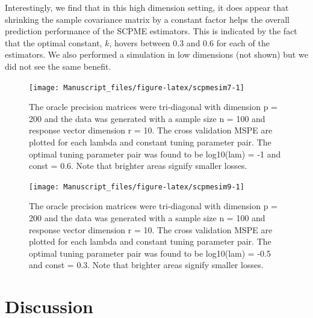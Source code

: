 \documentclass[11pt,]{report}
\theoremstyle{definition}
\theoremstyle{definition}
\theoremstyle{definition}
\theoremstyle{remark}
\begin{document}
Interestingly, we find that in this high dimension setting, it does appear that shrinking the sample covariance matrix by a constant factor helps the overall prediction performance of the SCPME estimators. This is indicated by the fact that the optimal constant, \(k\), hovers between 0.3 and 0.6 for each of the estimators. We also performed a simulation in low dimensions (not shown) but we did not see the same benefit.

\vspace{0.5cm}

\vspace{0.5cm}
\begin{figure}

{\centering \texttt{[image: Manuscript\_files/figure-latex/scpmesim7-1]} 

}

\caption{The oracle precision matrices were tri-diagonal with dimension p = 200 and the data was generated with a sample size n = 100 and response vector dimension r = 10. The cross validation MSPE are plotted for each lambda and constant tuning parameter pair. The optimal tuning parameter pair was found to be log10(lam) = -1 and const = 0.6. Note that brighter areas signify smaller losses.}\label{fig:scpmesim7}
\end{figure}
\vspace{0.5cm}

\vspace{0.5cm}
\begin{figure}

{\centering \texttt{[image: Manuscript\_files/figure-latex/scpmesim9-1]} 

}

\caption{The oracle precision matrices were tri-diagonal with dimension p = 200 and the data was generated with a sample size n = 100 and response vector dimension r = 10. The cross validation MSPE are plotted for each lambda and constant tuning parameter pair. The optimal tuning parameter pair was found to be log10(lam) = -0.5 and const = 0.3. Note that brighter areas signify smaller losses.}\label{fig:scpmesim9}
\end{figure}
\vspace{0.5cm}

\newpage

\hypertarget{discussion}{%
\section{Discussion}\label{discussion}}
\end{document}
